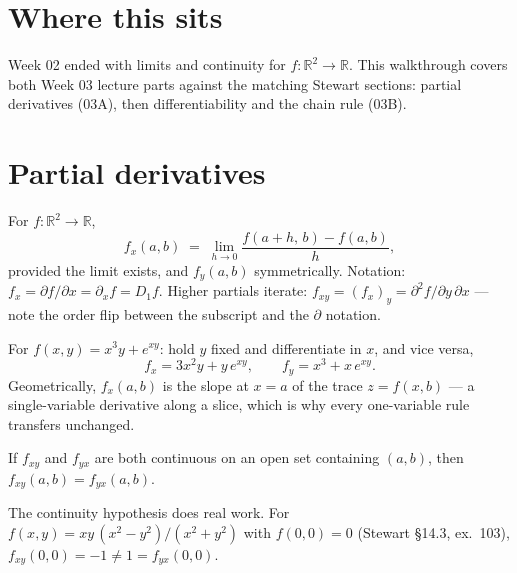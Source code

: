 
\section{Where this sits}
Week 02 ended with limits and continuity for $f:\mathbb{R}^2\to\mathbb{R}$. This walkthrough
covers both Week 03 lecture parts against the matching Stewart sections: partial derivatives
(03A), then differentiability and the chain rule (03B).

\section{Partial derivatives}

\begin{defn}
For $f:\mathbb{R}^2\to\mathbb{R}$,
\[
  f_x(a,b) \;=\; \lim_{h\to 0}\frac{f(a+h,\,b)-f(a,b)}{h},
\]
provided the limit exists, and $f_y(a,b)$ symmetrically. Notation:
$f_x = \partial f/\partial x = \partial_x f = D_1 f$. Higher partials iterate:
$f_{xy} = (f_x)_y = \partial^2 f/\partial y\,\partial x$ --- note the order flip between the
subscript and the $\partial$ notation.
\end{defn}

\begin{example}
For $f(x,y) = x^3 y + e^{xy}$: hold $y$ fixed and differentiate in $x$, and vice versa,
\[
  f_x = 3x^2 y + y\,e^{xy}, \qquad f_y = x^3 + x\,e^{xy}.
\]
Geometrically, $f_x(a,b)$ is the slope at $x=a$ of the trace $z = f(x,b)$ --- a single-variable
derivative along a slice, which is why every one-variable rule transfers unchanged.
\end{example}

\begin{thm}[Clairaut]
If $f_{xy}$ and $f_{yx}$ are both continuous on an open set containing $(a,b)$, then
$f_{xy}(a,b) = f_{yx}(a,b)$.
\end{thm}

\begin{remark}
The continuity hypothesis does real work. For
$f(x,y) = xy\,(x^2-y^2)/(x^2+y^2)$ with $f(0,0)=0$ (Stewart \S14.3, ex.~103),
$f_{xy}(0,0) = -1 \neq 1 = f_{yx}(0,0)$.
\end{remark}


